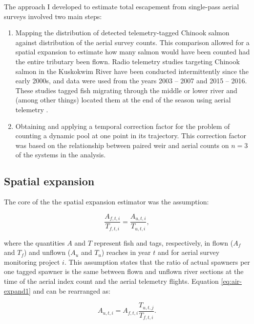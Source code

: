 \documentclass[12pt,]{book}
\theoremstyle{definition}
\theoremstyle{definition}
\theoremstyle{definition}
\theoremstyle{remark}
\begin{document}
The approach I developed to estimate total escapement from single-pass
aerial surveys involved two main steps:

\begin{enumerate}
\def\labelenumi{(\arabic{enumi})}
\item
  Mapping the distribution of detected telemetry-tagged Chinook salmon
  against distribution of the aerial survey counts. This comparison
  allowed for a spatial expansion to estimate how many salmon would have
  been counted had the entire tributary been flown. Radio telemetry
  studies targeting Chinook salmon in the Kuskokwim River have been
  conducted intermittently since the early 2000s, and data were used
  from the years 2003 -- 2007 and 2015 -- 2016. These studies tagged
  fish migrating through the middle or lower river and (among other
  things) located them at the end of the season using aerial telemetry
  \citep{stuby-2007, smith-liller-2017a, smith-liller-2017b}.
\item
  Obtaining and applying a temporal correction factor for the problem of
  counting a dynamic pool at one point in its trajectory. This
  correction factor was based on the relationship between paired weir
  and aerial counts on \(n=3\) of the systems in the analysis.
\end{enumerate}

\subsection{Spatial expansion}\label{spat-expansion}

\noindent
The core of the the spatial expansion estimator was the assumption:

\begin{equation}
  \frac{A_{f,t,i}}{T_{f,t,i}} = \frac{A_{u,t,i}}{T_{u,t,i}},
  \label{eq:air-expand1}
\end{equation}

\noindent
where the quantities \(A\) and \(T\) represent fish and tags,
respectively, in flown (\(A_f\) and \(T_f\)) and unflown (\(A_u\) and
\(T_u\)) reaches in year \(t\) and for aerial survey monitoring project
\(i\). This assumption states that the ratio of actual spawners per one
tagged spawner is the same between flown and unflown river sections at
the time of the aerial index count and the aerial telemetry flights.
Equation \eqref{eq:air-expand1} and can be rearranged as:

\begin{equation}
  A_{u,t,i} = A_{f,t,i} \frac{T_{u,t,j}}{T_{f,t,i}}.
  \label{eq:air-expand2}
\end{equation}
\end{document}
